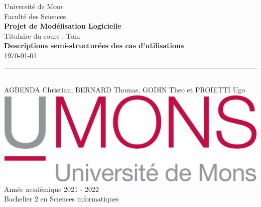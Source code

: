 \documentclass[french, a4paper, 12pt]{article}
\begin{document}
\nocite{*}

\begin{titlepage}
\begin{center}

Université de Mons\\Faculté des Sciences \\ \vspace{5mm}
\textbf{Projet de Modélisation Logicielle} \\ \vspace{5mm}
Titulaire du cours : Tom  \\        \vspace{25mm}
\LARGE{\textbf{Descriptions semi-structurées des cas d'utilisations }\\            \vspace{2mm}
}
\small{\today}\\
\rule{10cm}{3pt}\\                           \vspace{10mm}
\LARGE{AGBENDA Christian, BERNARD Thomas, GODIN Theo et PROIETTI Ugo  \bsc{}  \bsc{} } \\
\vspace{50mm}
\includegraphics[scale=0.25]{UMons.png}\\
\vspace{20pt}
Année académique 2021 - 2022\\
Bachelier 2 en Sciences informatiques\\
\end{center}

\end{titlepage}
\end{document}
